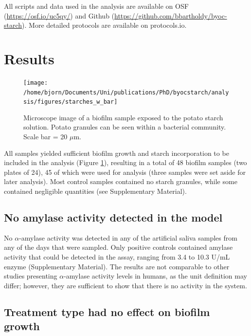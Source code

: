 \documentclass[
]{article}
\begin{document}
All scripts and data used in the analysis are available on OSF
(\url{https://osf.io/uc5qy/}) and Github (\url{https://github.com/bbartholdy/byoc-starch}).
More detailed protocols are available on protocols.io.

\hypertarget{results}{%
\section{Results}\label{results}}

\begin{figure}
\texttt{[image: /home/bjorn/Documents/Uni/publications/PhD/byocstarch/analysis/figures/starches\_w\_bar]} \caption{Microscope image of a biofilm sample exposed to the potato starch solution. Potato granules can be seen within a bacterial community. Scale bar = 20 $\mu$m.}\label{fig:microscope-fig}
\end{figure}

All samples yielded sufficient biofilm growth and starch incorporation to be
included in the analysis (Figure \ref{fig:microscope-fig}), resulting in a total of 48 biofilm samples (two plates of 24),
45 of which were used for analysis (three samples were set aside for later
analysis).
Most control samples contained no starch granules, while some contained negligible
quantities (see Supplementary Material).

\hypertarget{no-amylase-activity-detected-in-the-model}{%
\subsection{No amylase activity detected in the model}\label{no-amylase-activity-detected-in-the-model}}

No \(\alpha\)-amylase activity was detected in any of the artificial
saliva samples from any of the days that were sampled. Only positive controls
contained amylase activity that could be detected in the assay, ranging from
3.4 to 10.3 U/mL enzyme
(Supplementary Material).
The results are not comparable to other studies presenting \(\alpha\)-amylase activity
levels in humans, as the unit definition may differ;
however, they are sufficient to show that there is no activity in the system.

\hypertarget{treatment-type-had-no-effect-on-biofilm-growth}{%
\subsection{Treatment type had no effect on biofilm growth}\label{treatment-type-had-no-effect-on-biofilm-growth}}
\end{document}
